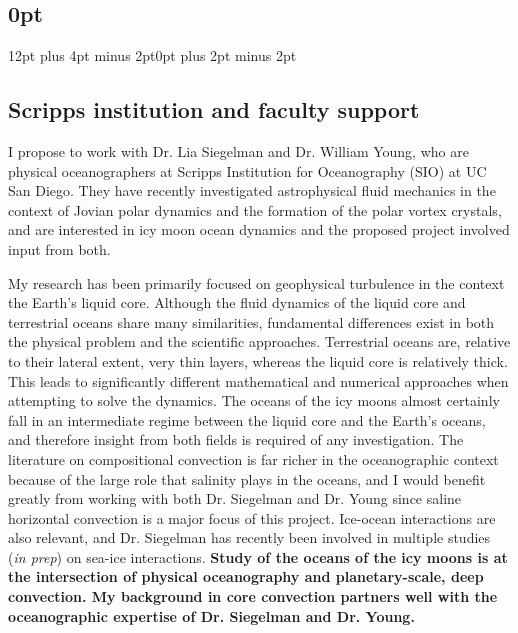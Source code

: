 \documentclass[12pt]{article}
\title{}
\author{}
\date{}
\begin{document}
\pagestyle{fancy}
\thispagestyle{fancy}
\setlength{\headheight}{25pt}
\titlespacing\subsection{0pt}{12pt plus 4pt minus 2pt}{0pt plus 2pt minus 2pt}
\fancyhf{} %
\fancyhead[L]{\textcolor{red}{Tobias Oliver\\
		Rationale for University of California San Diego\\
Proposed Mentor: Professor Lia Siegelman}}
\fancyfoot[R]{\thepage}
\subsection*{Scripps institution and faculty support}
I propose to work with Dr. Lia Siegelman and Dr. William Young, who are physical oceanographers at Scripps Institution for Oceanography (SIO) at UC San Diego. 
They have recently investigated astrophysical fluid mechanics in the context of Jovian polar dynamics and the formation of the polar vortex crystals\cite{lS22,lS22b,lS24}, and are interested in icy moon ocean dynamics and the proposed project involved input from both.

My research has been primarily focused on geophysical turbulence in the context the Earth's liquid core. Although the fluid dynamics of the liquid core and terrestrial oceans share many similarities, fundamental differences exist in both the physical problem and the scientific approaches. Terrestrial oceans are, relative to their lateral extent, very thin layers, whereas the liquid core is relatively thick. This leads to significantly different mathematical and numerical approaches when attempting to solve the dynamics.
The oceans of the icy moons almost certainly fall in an intermediate regime between the liquid core and the Earth's oceans, and therefore insight from both fields is required of any investigation. The literature on compositional convection is far richer in the oceanographic context because of the large role that salinity plays in the oceans, and I would benefit greatly from working with both Dr. Siegelman and Dr. Young since saline horizontal convection is a major focus of this project. 
Ice-ocean interactions are also relevant, and Dr. Siegelman has recently been involved in multiple studies (\textit{in prep}) on sea-ice interactions. 
\textbf{Study of the oceans of the icy moons is at the intersection of physical oceanography and planetary-scale, deep convection. My background in core convection partners well with the oceanographic expertise of Dr. Siegelman and Dr. Young.}
\end{document}
